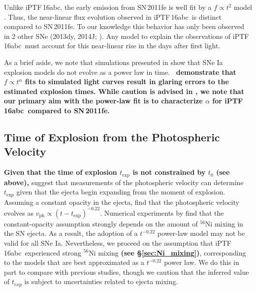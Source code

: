 \documentclass[twocolumn]{aastex61}
\newcommand{\abc}{iPTF\,16abc}
\begin{document}
Unlike \abc, the early emission from SN\,2011fe is well fit by a $f \propto
t^2$ model \citep{2011Natur.480..344N}. Thus, the near-linear flux evolution
observed in \abc\ is distinct compared to SN\,2011fe. To our knowledge this
behavior has only been observed in 2 other SNe (2013dy, 2014J;
\citealt{2013ApJ...778L..15Z,2014ApJ...783L..24Z,2015ApJ...799..106G}). Any
model to explain the observations of \abc\ must account for this near-linear
rise in the days after first light.

As a brief aside, we note that simulations presented in
\citet{2017MNRAS.472.2787N} show that SNe Ia explosion models do not evolve as
a power law in time. \textbf{\citeauthor{2017MNRAS.472.2787N}\ demonstrate
that $f \propto t^\alpha$ fits to simulated light curves result in glaring
errors to the estimated explosion times. While caution is advised in
\citet{2017MNRAS.472.2787N}, we note that our primary aim with the power-law
fit is to characterize $\alpha$ for \abc\ compared to SN\,2011fe.}

\subsection{Time of Explosion from the Photospheric Velocity}
\label{sec:early_vel}

\textbf{Given that the time of explosion $t_\mathrm{exp}$ is not constrained
by $t_0$ (see above),} \citet{2014ApJ...784...85P} suggest that measurements
of the photospheric velocity can determine $t_\mathrm{exp}$ given that the
ejecta begin expanding from the moment of explosion. Assuming a constant
opacity in the ejecta, \citeauthor{2014ApJ...784...85P} find that the
photospheric velocity evolves as
$v_\mathrm{ph}\propto(t-t_\mathrm{exp})^{-0.22}$. Numerical experiments by
\citet{2016ApJ...826...96P} find that the constant-opacity assumption strongly
depends on the amount of $^{56}$Ni mixing in the SN ejecta. As a result, the
adoption of a $t^{-0.22}$ power-law model may not be valid for all SNe Ia.
Nevertheless, we proceed on the assumption that \abc\ experienced strong
$^{56}$Ni mixing \textbf{(see \S\ref{sec:Ni_mixing})}, corresponding to the
models that are best approximated as a $t^{-0.22}$ power law. We do this in
part to compare with previous studies, though we caution that the inferred
value of $t_{exp}$ is subject to uncertainties related to ejecta mixing.
\end{document}

